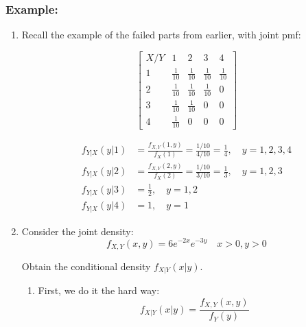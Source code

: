 \documentclass{article}
\begin{document}
\subsubsection*{Example:}
\begin{enumerate}
    \item Recall the example of the failed parts from earlier, with joint pmf:

    \begin{equation*}
        \begin{bmatrix}
            X/Y & 1 & 2 & 3 & 4\\
            1 & \frac{1}{10} & \frac{1}{10} & \frac{1}{10} & \frac{1}{10}\\
            2 &  \frac{1}{10} & \frac{1}{10} & \frac{1}{10} & 0\\
            3 & \frac{1}{10} & \frac{1}{10} & 0 & 0\\
            4  & \frac{1}{10} & 0 & 0 & 0
        \end{bmatrix}
    \end{equation*}

    \begin{equation*}
        \begin{split}
            f_{Y|X}(y|1) &= \frac{f_{X,Y}(1,y)}{f_X(1)} = \frac{1/10}{4/10} = \frac{1}{4}, \quad y = 1,2,3,4\\
            f_{Y|X}(y|2) &= \frac{f_{X,Y}(2,y)}{f_X(2)} = \frac{1/10}{3/10} = \frac{1}{3}, \quad y = 1,2,3\\
            f_{Y|X}(y|3) &= \frac{1}{2}, \quad y = 1,2\\
            f_{Y|X}(y|4) &= 1, \quad y = 1
        \end{split}
    \end{equation*}

    \item Consider the joint density:
    \begin{equation*}
        f_{X,Y}(x,y) = 6 e^{-2x}e^{-3y} \quad x>0, y>0
    \end{equation*}

    Obtain the conditional density $f_{X|Y}(x|y)$.

    \begin{enumerate}
        \item First, we do it the hard way:
        \begin{equation*}
            f_{X|Y}(x|y) = \frac{f_{X,Y}(x,y)}{f_Y(y)}
        \end{equation*}


\end{enumerate}
\end{enumerate}
\end{document}
